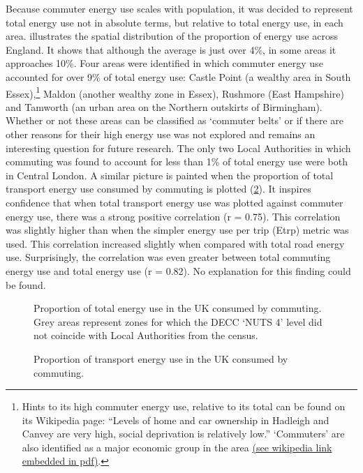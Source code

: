 Because commuter energy use scales with population, it was decided to represent
total energy use not in absolute terms, but relative to total energy use,
in each area.  illustrates the spatial distribution of
the proportion of energy use across England. It shows that although the
average is just over 4\%, in some areas it approaches 10\%. Four areas
were identified in which commuter energy use accounted for over 9\% of total
energy use: Castle Point (a wealthy area in South
Essex),\footnote{Hints to its high commuter energy use, relative to its total
can be found on its Wikipedia page:
``Levels of home and car ownership in Hadleigh and Canvey are very high,
social deprivation is relatively low.'' `Commuters' are also
identified as a major economic group in the area {\color{blue}
\href{http://tinyurl.com/qfkb9ta}
{(see wikipedia link embedded in pdf)}}.
}
Maldon (another wealthy zone in Essex),
Rushmore (East Hampshire) and Tamworth (an urban area on the Northern
outskirts of Birmingham). Whether or not these areas can be classified as
`commuter belts' or if there are other reasons for their high energy use was
not explored and remains an interesting question for future research.
The only two Local Authorities in which commuting was found to account
for less than 1\% of total energy use were both in Central London.
A similar picture is painted when the proportion of total transport
energy use consumed by commuting is plotted (\cref{fproptrans}).
It inspires confidence that when total transport energy use was plotted
against commuter energy use, there was a strong positive correlation
(r = 0.75). This correlation was slightly higher than when
the simpler energy use per trip (Etrp) metric was used.
This correlation increased slightly when compared with
total road energy use. Surprisingly, the correlation
was even greater between total commuting energy use and total energy use
(r = 0.82). No explanation for this finding could be found.

\begin{figure}
 \caption[Proportion of total energy use in the UK consumed by commuting]
 {Proportion of total energy use in the UK consumed by commuting.
 Grey areas represent zones for which the DECC `NUTS 4' level did not coincide with
 Local Authorities from the census.
 }
 \label{fpropten}
\end{figure}

\begin{figure}
 \caption{Proportion of transport energy use in the UK consumed by commuting.}
 \label{fproptrans}
\end{figure}


